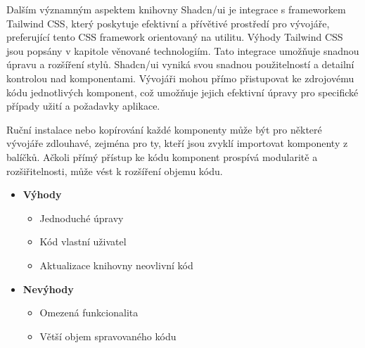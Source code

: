 Dalším významným aspektem knihovny Shadcn/ui je integrace s frameworkem Tailwind CSS, který poskytuje efektivní a přívětivé prostředí pro vývojáře,
preferující tento CSS framework orientovaný na utilitu. Výhody Tailwind CSS jsou popsány v kapitole věnované technologiím. Tato integrace umožňuje snadnou úpravu
a rozšíření stylů. Shadcn/ui vyniká svou snadnou použitelností a detailní kontrolou nad komponentami. Vývojáři mohou přímo přistupovat ke zdrojovému kódu
jednotlivých komponent, což umožňuje jejich efektivní úpravy pro specifické případy užití a požadavky aplikace.

Ruční instalace nebo kopírování každé komponenty může být pro některé vývojáře zdlouhavé, zejména pro ty, kteří jsou zvyklí importovat komponenty z balíčků.
Ačkoli přímý přístup ke kódu komponent prospívá modularitě a rozšiřitelnosti, může vést k rozšíření objemu kódu.


\begin{itemize}
    \item \textbf{Výhody}
    \begin{itemize}
        \item Jednoduché úpravy
        \item Kód vlastní uživatel
        \item Aktualizace knihovny neovlivní kód
    \end{itemize}
    \item \textbf{Nevýhody}
    \begin{itemize}
        \item Omezená funkcionalita
        \item Větší objem spravovaného kódu
    \end{itemize}
\end{itemize}





